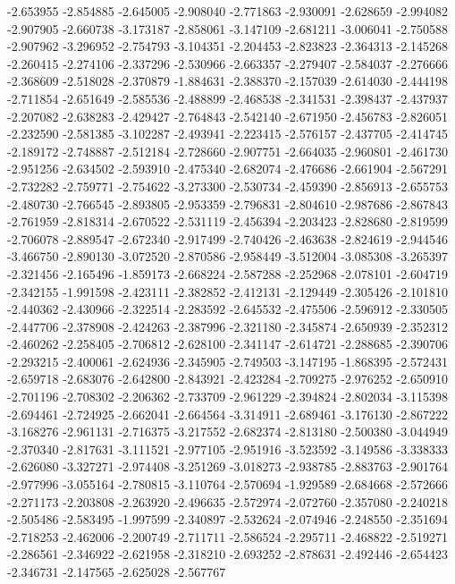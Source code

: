 -2.653955
-2.854885
-2.645005
-2.908040
-2.771863
-2.930091
-2.628659
-2.994082
-2.907905
-2.660738
-3.173187
-2.858061
-3.147109
-2.681211
-3.006041
-2.750588
-2.907962
-3.296952
-2.754793
-3.104351
-2.204453
-2.823823
-2.364313
-2.145268
-2.260415
-2.274106
-2.337296
-2.530966
-2.663357
-2.279407
-2.584037
-2.276666
-2.368609
-2.518028
-2.370879
-1.884631
-2.388370
-2.157039
-2.614030
-2.444198
-2.711854
-2.651649
-2.585536
-2.488899
-2.468538
-2.341531
-2.398437
-2.437937
-2.207082
-2.638283
-2.429427
-2.764843
-2.542140
-2.671950
-2.456783
-2.826051
-2.232590
-2.581385
-3.102287
-2.493941
-2.223415
-2.576157
-2.437705
-2.414745
-2.189172
-2.748887
-2.512184
-2.728660
-2.907751
-2.664035
-2.960801
-2.461730
-2.951256
-2.634502
-2.593910
-2.475340
-2.682074
-2.476686
-2.661904
-2.567291
-2.732282
-2.759771
-2.754622
-3.273300
-2.530734
-2.459390
-2.856913
-2.655753
-2.480730
-2.766545
-2.893805
-2.953359
-2.796831
-2.804610
-2.987686
-2.867843
-2.761959
-2.818314
-2.670522
-2.531119
-2.456394
-2.203423
-2.828680
-2.819599
-2.706078
-2.889547
-2.672340
-2.917499
-2.740426
-2.463638
-2.824619
-2.944546
-3.466750
-2.890130
-3.072520
-2.870586
-2.958449
-3.512004
-3.085308
-3.265397
-2.321456
-2.165496
-1.859173
-2.668224
-2.587288
-2.252968
-2.078101
-2.604719
-2.342155
-1.991598
-2.423111
-2.382852
-2.412131
-2.129449
-2.305426
-2.101810
-2.440362
-2.430966
-2.322514
-2.283592
-2.645532
-2.475506
-2.596912
-2.330505
-2.447706
-2.378908
-2.424263
-2.387996
-2.321180
-2.345874
-2.650939
-2.352312
-2.460262
-2.258405
-2.706812
-2.628100
-2.341147
-2.614721
-2.288685
-2.390706
-2.293215
-2.400061
-2.624936
-2.345905
-2.749503
-3.147195
-1.868395
-2.572431
-2.659718
-2.683076
-2.642800
-2.843921
-2.423284
-2.709275
-2.976252
-2.650910
-2.701196
-2.708302
-2.206362
-2.733709
-2.961229
-2.394824
-2.802034
-3.115398
-2.694461
-2.724925
-2.662041
-2.664564
-3.314911
-2.689461
-3.176130
-2.867222
-3.168276
-2.961131
-2.716375
-3.217552
-2.682374
-2.813180
-2.500380
-3.044949
-2.370340
-2.817631
-3.111521
-2.977105
-2.951916
-3.523592
-3.149586
-3.338333
-2.626080
-3.327271
-2.974408
-3.251269
-3.018273
-2.938785
-2.883763
-2.901764
-2.977996
-3.055164
-2.780815
-3.110764
-2.570694
-1.929589
-2.684668
-2.572666
-2.271173
-2.203808
-2.263920
-2.496635
-2.572974
-2.072760
-2.357080
-2.240218
-2.505486
-2.583495
-1.997599
-2.340897
-2.532624
-2.074946
-2.248550
-2.351694
-2.718253
-2.462006
-2.200749
-2.711711
-2.586524
-2.295711
-2.468822
-2.519271
-2.286561
-2.346922
-2.621958
-2.318210
-2.693252
-2.878631
-2.492446
-2.654423
-2.346731
-2.147565
-2.625028
-2.567767
